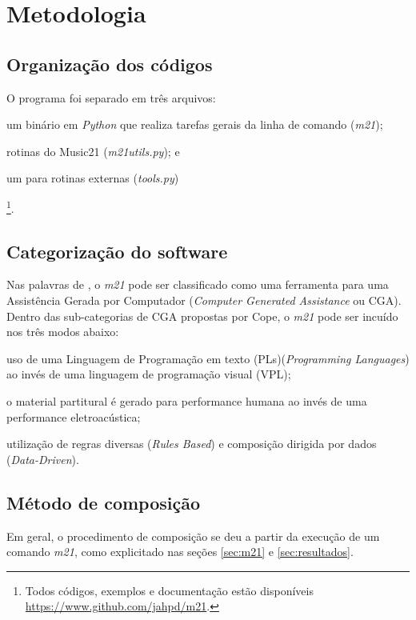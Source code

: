 \section{Metodologia}\label{sec:metodo}

\subsection*{Organização dos códigos}

O programa foi separado em três arquivos: \begin{inparaenum}
\item um binário em \emph{Python} que realiza tarefas gerais da linha de comando (\emph{m21});
\item rotinas do Music21 (\emph{m21utils.py}); e 
\item um para rotinas externas (\emph{tools.py})
\end{inparaenum}\footnote{Todos códigos, exemplos e documentação estão disponíveis \url{https://www.github.com/jahpd/m21}.}.

\subsection*{Categorização do software}

Nas palavras de \cite[p.~x-xiii]{cope_prefacio_2008}, o \emph{m21} pode ser classificado como uma ferramenta para uma Assistência Gerada por Computador (\emph{Computer Generated Assistance} ou CGA). Dentro das sub-categorias de CGA propostas por Cope, o \emph{m21} pode ser incuído nos três modos abaixo:\begin{inparaenum}
\item uso de uma Linguagem de Programação em texto (PLs)(\emph{Programming Languages}) ao invés de uma linguagem de programação visual (VPL); 
\item o material partitural é gerado para performance humana ao invés de uma performance eletroacústica;
\item utilização de regras diversas (\emph{Rules Based}) e composição dirigida por dados (\emph{Data-Driven}).
\end{inparaenum}

\subsection*{Método de composição}

Em geral, o procedimento de composição se deu a partir da execução de um comando \emph{m21}, como explicitado nas seções \ref{sec:m21} e \ref{sec:resultados}.

